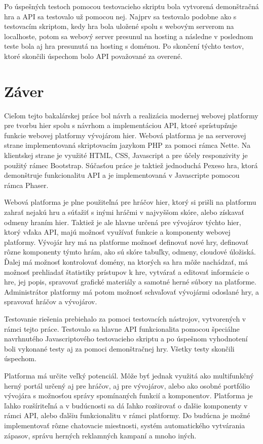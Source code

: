 Po úspešných testoch pomocou testovacieho skriptu bola vytvorená demonštračná hra a API sa testovalo už pomocou nej. Najprv sa testovalo podobne ako s testovacím skriptom, kedy hra bola uložené spolu s webovým serverom na localhoste, potom sa webový server presunul na hosting a následne v poslednom teste bola aj hra presunutá na hosting s doménou. Po skončení týchto testov, ktoré skončili úspechom bolo API považované za overené. 

\chapter{Záver}
\label{chap:zaver}
Cieľom tejto bakalárskej práce bol návrh a realizácia modernej webovej platformy pre tvorbu hier spolu s návrhom a implementáciou API, ktoré sprístupňuje funkcie webovej platformy vývojárom hier. Webová platforma je na serverovej strane implementovaná skriptovacím jazykom PHP za pomoci rámca Nette. Na klientskej strane je využité HTML, CSS, Javascript a pre účely responzivity je použitý rámec Bootstrap. Súčasťou práce je taktiež jednoduchá Pexeso hra, ktorá demonštruje funkcionalitu API a je implementovaná v Javascripte pomocou rámca Phaser. 

Webová platforma je plne použiteľná pre hráčov hier, ktorý si prišli na platformu zahrať nejakú hru a súťažiť s inými hráčmi v najvyššom skóre, alebo získavať odmeny hraním hier. Taktiež je ale hlavne určená pre vývojárov týchto hier, ktorý vďaka API, majú možnosť využívať funkcie a komponenty webovej platformy. Vývojár hry má na platforme možnosť definovať nové hry, definovať rôzne komponenty týmto hrám, ako sú skóre tabuľky, odmeny, cloudové úložiská. Ďalej má možnosť kontrolovať domény, na ktorých sa hra môže nachádzať, má možnosť prehliadať štatistiky prístupov k hre, vytvárať a editovať informácie o hre, jej popis, spravovať grafické materiály a samotné herné súbory na platforme.  Administrátor platformy má potom možnosť schvaľovať vývojármi odoslané hry, a spravovať hráčov a vývojárov. 

Testovanie riešenia prebiehalo za pomoci testovacích nástrojov, vytvorených v rámci tejto práce. Testovalo sa hlavne API funkcionalita pomocou špeciálne navrhnutého Javascriptového testovacieho skriptu a po úspešnom vyhodnotení boli vykonané testy aj za pomoci demonštračnej hry. Všetky testy skončili úspechom.  

Platforma má určite veľký potenciál. Môže byť jednak využitá ako multifunkčný herný portál určený aj pre hráčov, aj pre vývojárov, alebo ako osobné portfólio vývojára s možnosťou správy spomínaných funkcií a komponentov. Platforma je ľahko rozšíriteľná a v budúcnosti sa dá ľahko rozširovať o ďalšie komponenty v rámci API, alebo ďalšiu funkcionalitu v rámci platformy. Do budúcna je možné implementovať rôzne chatovacie miestnosti, systém automatického vytvárania zápasov, správu herných reklamných kampaní a mnoho iných. 















